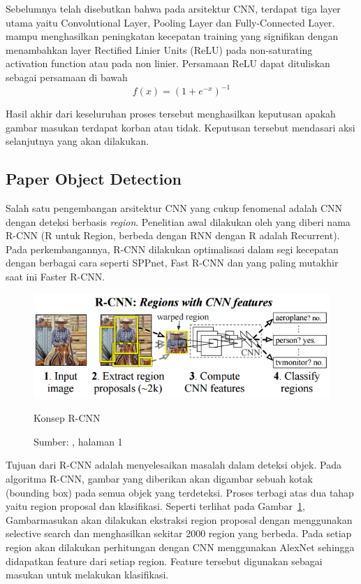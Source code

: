 Sebelumnya telah disebutkan bahwa pada arsitektur CNN, terdapat tiga layer utama yaitu Convolutional Layer, Pooling Layer dan Fully-Connected Layer. \citet{krizhevsky2012imagenet} mampu menghasilkan peningkatan kecepatan training yang signifikan dengan menambahkan layer Rectified Linier Units (ReLU) pada non-saturating activation function atau pada non linier. Persamaan ReLU dapat dituliskan sebagai persamaan di bawah
\begin{equation}
 f(x) = (1+e^{-x})^{-1}
\end{equation}

Hasil akhir dari keseluruhan proses tersebut menghasilkan keputusan apakah gambar masukan terdapat korban atau tidak. Keputusan tersebut mendasari aksi selanjutnya yang akan dilakukan.

\subsection{Paper Object Detection}
Salah satu pengembangan arsitektur CNN yang cukup fenomenal adalah CNN dengan deteksi berbasis \textit{region}. Penelitian awal dilakukan oleh \citet{girshick2014rich} yang diberi nama R-CNN (R untuk Region, berbeda dengan RNN dengan R adalah Recurrent). Pada perkembangannya, R-CNN dilakukan optimalisasi dalam segi kecepatan dengan berbagai cara seperti SPPnet\cite{he2014spatial}, Fast R-CNN\cite{girshick2015fast} dan yang paling mutakhir saat ini Faster R-CNN\cite{ren2015faster}.

\begin{figure}[ht]
  \includegraphics[width=\textwidth]{rcnn}
  \caption{Konsep R-CNN}
  \caption*{Sumber: \citet{girshick2014rich}, halaman 1}
  \label{fig:rcnn}
\end{figure}
Tujuan dari R-CNN adalah menyelesaikan masalah dalam deteksi objek. Pada algoritma R-CNN, gambar yang diberikan akan digambar sebuah kotak (bounding box) pada semua objek yang terdeteksi. Proses terbagi atas dua tahap yaitu region proposal dan klasifikasi. Seperti terlihat pada Gambar~\ref{fig:rcnn}, Gambarmasukan akan dilakukan ekstraksi region proposal dengan menggunakan selective search dan menghasilkan sekitar 2000 region yang berbeda. Pada setiap region akan dilakukan perhitungan dengan CNN menggunakan AlexNet sehingga didapatkan feature dari setiap region. Feature tersebut digunakan sebagai masukan untuk melakukan klasifikasi. 

